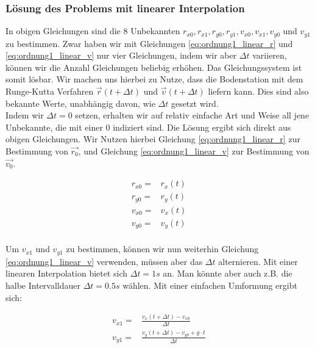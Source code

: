 \subsubsection{Lösung des Problems mit linearer Interpolation}\label{section:perturbation_ordnung1_linear}

In obigen Gleichungen sind die 8 Unbekannten $r_{x0}, r_{x1}, r_{y0}, r_{y1}, v_{x0}, v_{x1}, v_{y0}$ und $v_{y1}$ zu bestimmen. Zwar haben wir mit Gleichungen \ref{eq:ordnung1_linear_r} und \ref{eq:ordnung1_linear_v} nur vier Gleichungen, indem wir aber $\Delta t$ variieren, können wir die Anzahl Gleichungen beliebig erhöhen. Das Gleichungssystem ist somit lösbar. Wir machen uns hierbei zu Nutze, dass die Bodenstation mit dem Runge-Kutta Verfahren $\vec{r}(t + \Delta t)$ und $\vec{v}(t + \Delta t)$ liefern kann. Dies sind also bekannte Werte, unabhängig davon, wie $\Delta t$ gesetzt wird.\\

Indem wir $\Delta t = 0$ setzen, erhalten wir auf relativ einfache Art und Weise all jene Unbekannte, die mit einer $0$ indiziert sind. Die Lösung ergibt sich direkt aus obigen Gleichungen. Wir Nutzen hierbei Gleichung \eqref{eq:ordnung1_linear_r} zur Bestimmung von $\vec{r_0}$, und Gleichung \eqref{eq:ordnung1_linear_v} zur Bestimmung von $\vec{v_0}$.

\begin{equation}
\label{eq:ordnung1_linear_solutionPart1}
\begin{aligned}
r_{x0} =& r_x(t) \\
r_{y0} =& r_y(t) \\
v_{x0} =& v_x(t) \\
v_{y0} =& v_y(t) \\
\end{aligned}
\end{equation}

Um $v_{x1}$ und $v_{y1}$ zu bestimmen, können wir nun weiterhin Gleichung \ref{eq:ordnung1_linear_v} verwenden, müssen aber das $\Delta t$ alternieren. Mit einer linearen Interpolation bietet sich $\Delta t = 1s$ an. Man könnte aber auch z.B. die halbe Intervalldauer $\Delta t = 0.5s$ wählen. Mit einer einfachen Umformung ergibt sich:

\begin{equation}
\label{eq:ordnung1_linear_solutionPart2}
\begin{aligned}
v_{x1} =& \frac{v_x(t + \Delta t) - v_{x0}}{\Delta t} \\
v_{y1} =& \frac{v_y(t + \Delta t) - v_{y0} + g \cdot t}{\Delta t}
\end{aligned}
\end{equation}

